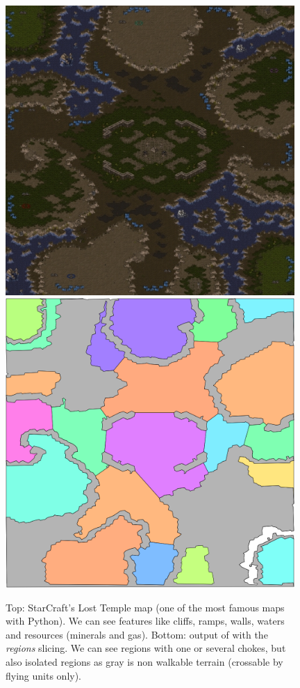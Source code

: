 \begin{figure}[!h]
\begin{center}
\includegraphics[width=11cm]{images/ICCup_lost_temple_24.jpg}
\includegraphics[width=11cm]{images/iccup_lost_temple_24scx-analyzed.png}
\caption{Top: StarCraft's Lost Temple map (one of the most famous maps with Python). We can see features like cliffs, ramps, walls, waters and resources (minerals and gas). Bottom: output of  with the \textit{regions} slicing. We can see regions with one or several chokes, but also isolated regions as gray is non walkable terrain (crossable by flying units only).}
\thispagestyle{empty}
\label{fig:BWTA}
\end{center}
\end{figure}

